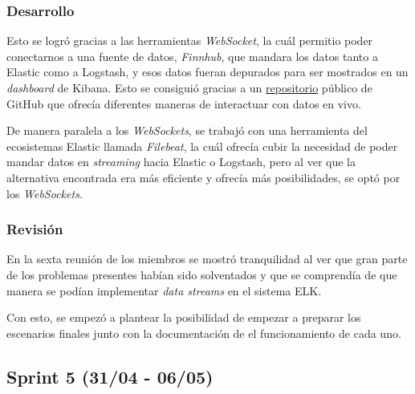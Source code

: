 \subsubsection{Desarrollo}
Esto se logró gracias a las herramientas \textit{WebSocket}, la cuál permitio poder conectarnos a una fuente de datos, \textit{Finnhub}, que mandara los datos tanto a Elastic como a Logstash, y esos datos fueran depurados para ser mostrados en un \textit{dashboard} de Kibana. Esto se consiguió gracias a un \href{https://github.com/ColinEberhardt/awesome-public-streaming-datasets}{repositorio} público de GitHub que ofrecía diferentes maneras de interactuar con datos en vivo.

De manera paralela a los \textit{WebSockets}, se trabajó con una herramienta del ecosistemas Elastic llamada \textit{Filebeat}, la cuál ofrecía cubir la necesidad de poder mandar datos en \textit{streaming} hacia Elastic o Logstash, pero al ver que la alternativa encontrada era más eficiente y ofrecía más posibilidades, se optó por los \textit{WebSockets}.

\subsubsection{Revisión}
En la sexta reunión de los miembros se mostró tranquilidad al ver que gran parte de los problemas presentes habían sido solventados y que se comprendía de que manera se podían implementar \textit{data streams} en el sistema ELK.

Con esto, se empezó a plantear la posibilidad de empezar a preparar los escenarios finales junto con la documentación de el funcionamiento de cada uno.

\paragraph{}
\paragraph{}
\paragraph{}
\paragraph{}


\subsection{Sprint 5 (31/04 - 06/05)}
